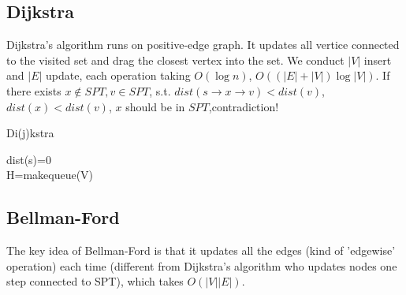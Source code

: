 \documentclass{article}
\begin{document}
\subsection{Dijkstra}
Dijkstra's algorithm runs on positive-edge graph. It updates all vertice connected to the visited set and drag the closest vertex into the set. We conduct $|V|$ insert and $|E|$ update, each operation taking $O(\log n)$, $O((|E|+|V|)\log|V|)$. 
If there exists $x \notin SPT, v \in SPT$, s.t. $dist(s\rightarrow x \rightarrow v)<dist(v)$, $dist(x)<dist(v)$, $x$ should be in $SPT$,contradiction! 
\begin{algorithm}
\caption{Di(j)kstra}
\label{fig:dijk}

dist(s)=0\\
H=makequeue(V)\\
\end{algorithm}

\subsection{Bellman-Ford}
The key idea of Bellman-Ford is that it updates all the edges (kind of 'edgewise' operation) each time (different from Dijkstra's algorithm who updates nodes one step connected to SPT), which takes $O(|V||E|)$.
\end{document}
